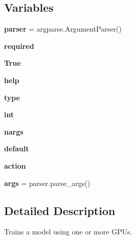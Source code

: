 \subsection*{Variables}
\begin{DoxyCompactItemize}
\item 
\mbox{\label{namespacetrain_a242e49c387b90838a9072c79886a10ec}} 
{\bfseries parser} = argparse.\+Argument\+Parser()
\item 
\mbox{\label{namespacetrain_a3c2dd63c131ee6c6d543d543760d522e}} 
{\bfseries required}
\item 
\mbox{\label{namespacetrain_ab05c503109ea425e4f6a12524cd504db}} 
{\bfseries True}
\item 
\mbox{\label{namespacetrain_ac16504ad52822423344025f791e0c4fd}} 
{\bfseries help}
\item 
\mbox{\label{namespacetrain_ad99775ad96e0996a8be4782b30a28c2e}} 
{\bfseries type}
\item 
\mbox{\label{namespacetrain_af5de906790efe7cea370f1a69e020d52}} 
{\bfseries int}
\item 
\mbox{\label{namespacetrain_aa14681106dd0acfe6521d6ad074c434b}} 
{\bfseries nargs}
\item 
\mbox{\label{namespacetrain_abfb9b8d0ebf72bafd04e084791275553}} 
{\bfseries default}
\item 
\mbox{\label{namespacetrain_ae65fafa56b338044344f2637be98e99a}} 
{\bfseries action}
\item 
\mbox{\label{namespacetrain_a4de53a6f6383e12bc42e05dfea879dab}} 
{\bfseries args} = parser.\+parse\+\_\+args()
\end{DoxyCompactItemize}


\subsection{Detailed Description}
\begin{DoxyVerb}Trains a model using one or more GPUs.
\end{DoxyVerb}
 